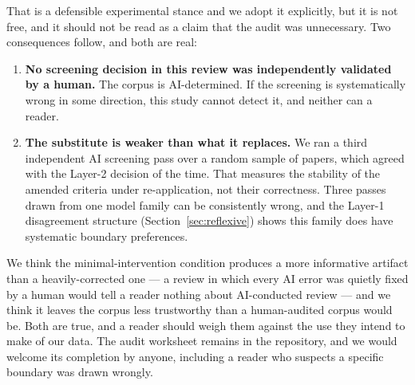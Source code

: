 That is a defensible experimental stance and we adopt it explicitly, but it is not free, and it
should not be read as a claim that the audit was unnecessary. Two consequences follow, and both
are real:

\begin{enumerate}\itemsep2pt
\item \textbf{No screening decision in this review was independently validated by a human.}
The corpus is AI-determined. If the screening is systematically wrong in some direction, this
study cannot detect it, and neither can a reader.
\item \textbf{The substitute is weaker than what it replaces.} We ran a third independent AI
screening pass over a random sample of \nCons{} papers, which agreed with the Layer-2 decision
\consAgree{} of the time. That measures the stability of the amended criteria under
re-application, not their correctness. Three passes drawn from one model family can be
consistently wrong, and the Layer-1 disagreement structure (Section~\ref{sec:reflexive}) shows
this family does have systematic boundary preferences.
\end{enumerate}

We think the minimal-intervention condition produces a more informative artifact than a
heavily-corrected one --- a review in which every AI error was quietly fixed by a human would
tell a reader nothing about AI-conducted review --- and we think it leaves the corpus less
trustworthy than a human-audited corpus would be. Both are true, and a reader should weigh
them against the use they intend to make of our data. The audit worksheet remains in the
repository, and we would welcome its completion by anyone, including a reader who suspects a
specific boundary was drawn wrongly.
